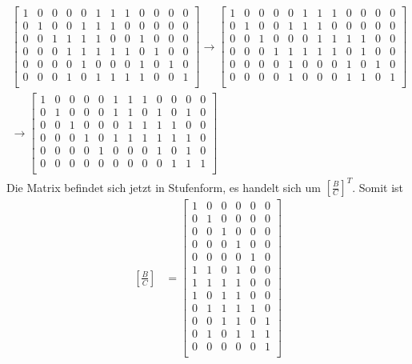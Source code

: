 \documentclass[a4paper,10pt,ngerman]{scrartcl}
\begin{document}
\begin{align*}
\left[ \begin{array}{cccccc|cccccc}
1 & 0 & 0 & 0 & 0 & 1 & 1 & 1 & 0 & 0 & 0 & 0 \\
0 & 1 & 0 & 0 & 1 & 1 & 1 & 0 & 0 & 0 & 0 & 0 \\
0 & 0 & 1 & 1 & 1 & 1 & 0 & 0 & 1 & 0 & 0 & 0 \\
0 & 0 & 0 & 1 & 1 & 1 & 1 & 1 & 0 & 1 & 0 & 0 \\
0 & 0 & 0 & 0 & 1 & 0 & 0 & 0 & 1 & 0 & 1 & 0 \\
0 & 0 & 0 & 1 & 0 & 1 & 1 & 1 & 1 & 0 & 0 & 1 \\
\end{array} \right]
\rightarrow \left[ \begin{array}{cccccc|cccccc}
1 & 0 & 0 & 0 & 0 & 1 & 1 & 1 & 0 & 0 & 0 & 0 \\
0 & 1 & 0 & 0 & 1 & 1 & 1 & 0 & 0 & 0 & 0 & 0 \\
0 & 0 & 1 & 0 & 0 & 0 & 1 & 1 & 1 & 1 & 0 & 0 \\
0 & 0 & 0 & 1 & 1 & 1 & 1 & 1 & 0 & 1 & 0 & 0 \\
0 & 0 & 0 & 0 & 1 & 0 & 0 & 0 & 1 & 0 & 1 & 0 \\
0 & 0 & 0 & 0 & 1 & 0 & 0 & 0 & 1 & 1 & 0 & 1 \\
\end{array} \right] \\
\rightarrow \left[ \begin{array}{cccccc|cccccc}
1 & 0 & 0 & 0 & 0 & 1 & 1 & 1 & 0 & 0 & 0 & 0 \\
0 & 1 & 0 & 0 & 0 & 1 & 1 & 0 & 1 & 0 & 1 & 0 \\
0 & 0 & 1 & 0 & 0 & 0 & 1 & 1 & 1 & 1 & 0 & 0 \\
0 & 0 & 0 & 1 & 0 & 1 & 1 & 1 & 1 & 1 & 1 & 0 \\
0 & 0 & 0 & 0 & 1 & 0 & 0 & 0 & 1 & 0 & 1 & 0 \\
0 & 0 & 0 & 0 & 0 & 0 & 0 & 0 & 0 & 1 & 1 & 1 \\
\end{array} \right]
\end{align*}
Die Matrix befindet sich jetzt in Stufenform, es handelt sich um $\left[\frac{B}{C}\right]^T$. Somit ist
\begin{align*}
\left[\frac{B}{C}\right]&=\left[ \begin{array}{cccccc}
1 & 0 & 0 & 0 & 0 & 0 \\
0 & 1 & 0 & 0 & 0 & 0 \\
0 & 0 & 1 & 0 & 0 & 0 \\
0 & 0 & 0 & 1 & 0 & 0 \\
0 & 0 & 0 & 0 & 1 & 0 \\
1 & 1 & 0 & 1 & 0 & 0 \\
\hline
1 & 1 & 1 & 1 & 0 & 0 \\
1 & 0 & 1 & 1 & 0 & 0 \\
0 & 1 & 1 & 1 & 1 & 0 \\
0 & 0 & 1 & 1 & 0 & 1 \\
0 & 1 & 0 & 1 & 1 & 1 \\
0 & 0 & 0 & 0 & 0 & 1 \\
\end{array} \right]
\end{align*}
\end{document}
